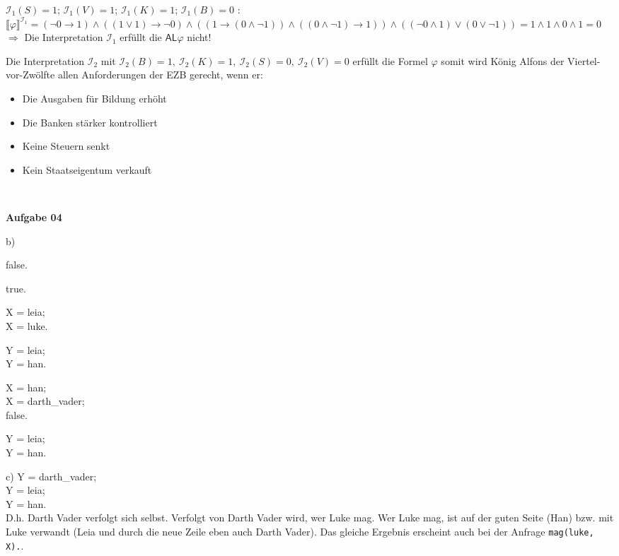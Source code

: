 \documentclass[a4paper,10pt]{article}
\begin{document}
\begin{compactenum}[(a)]
		\item $  \mathcal{I}_1(S)=1 $; $  \mathcal{I}_1(V)=1 $; $  \mathcal{I}_1(K)=1 $; $  \mathcal{I}_1(B)=0 $ : \\
		$\llbracket \varphi \rrbracket ^{ \mathcal{I}_1} = (\lnot 0 \rightarrow 1) \wedge ((1 \vee 1) \rightarrow \lnot 0) \wedge ((1 \rightarrow (0 \wedge \lnot 1)) \wedge ((0 \wedge \lnot 1) \rightarrow 1)) \wedge ((\lnot 0 \wedge 1)\vee(0 \vee \lnot 1)) = 1 \wedge 1 \wedge 0 \wedge 1 = 0$\\
		$\Longrightarrow$ Die Interpretation $\mathcal{I}_1$ erfüllt die $\mathsf{AL} \varphi$ nicht!
		\item Die Interpretation $ \mathcal{I}_2 $ mit $ \mathcal{I}_2(B) = 1,\ \mathcal{I}_2(K) = 1,\ \mathcal{I}_2(S) = 0,\ \mathcal{I}_2(V) = 0 $ erfüllt die Formel $ \varphi $ somit wird König Alfons der Viertel-vor-Zwölfte allen Anforderungen der EZB gerecht, wenn er:
		\begin{itemize}
			\item Die Ausgaben für Bildung erhöht
			\item Die Banken stärker kontrolliert
			\item Keine Steuern senkt
			\item Kein Staatseigentum verkauft
		\end{itemize}
	\end{compactenum}\

	\newpage
	
	\textbf{Aufgabe 04}
	\begin{compactenum}
		\item [b)]
		\begin{compactenum}[i)]
			\item false.
			\item true.
			\item X = leia;\\
			X = luke.
			\item Y = leia;\\
			Y = han.
			\item X = han;\\
			X = darth\_vader;\\
			false.
			\item Y = leia;\\
			Y = han.
		\end{compactenum}
		\item [c)]
		Y = darth\_vader;\\
		Y = leia;\\
		Y = han.\\
		D.h. Darth Vader verfolgt sich selbst. Verfolgt von Darth Vader wird, wer Luke mag. Wer Luke mag, ist auf der guten Seite (Han) bzw. mit Luke verwandt (Leia und durch die neue Zeile eben auch Darth Vader). Das gleiche Ergebnis erscheint auch bei der Anfrage \verb|mag(luke, X).|.
	\end{compactenum}
\end{document}
